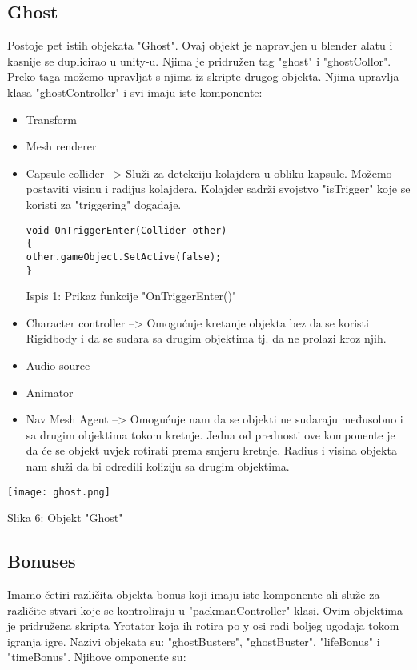 \subsection{Ghost}
Postoje pet istih objekata "Ghost". Ovaj objekt je napravljen u blender alatu i kasnije se duplicirao u unity-u. Njima je pridružen tag "ghost" i "ghostCollor". Preko taga možemo upravljat s njima iz skripte drugog objekta. Njima upravlja klasa "ghostController" i svi imaju iste komponente:

\begin{itemize}
\item Transform

\item Mesh renderer

\item Capsule collider --> Služi za detekciju kolajdera u obliku kapsule. Možemo postaviti visinu i radijus kolajdera. Kolajder sadrži svojstvo "isTrigger" koje se koristi za "triggering" događaje.


\begin{verbatim}
void OnTriggerEnter(Collider other)
{
other.gameObject.SetActive(false);
}
\end{verbatim}
\begin{center}
	
	Ispis 1: Prikaz funkcije "OnTriggerEnter()"
\end{center}
\item Character controller --> Omogućuje kretanje objekta bez da se koristi Rigidbody i da se sudara sa drugim objektima tj. da ne prolazi kroz njih.

\item Audio source

\item Animator

\item Nav Mesh Agent --> Omogućuje nam da se objekti ne sudaraju međusobno i sa drugim objektima tokom kretnje. Jedna od prednosti ove komponente je da će se objekt uvjek rotirati prema smjeru kretnje. Radius i visina objekta nam služi da bi odredili koliziju sa drugim objektima.

\end{itemize}

\begin{center}
	\texttt{[image: ghost.png]}
	
	Slika 6: Objekt "Ghost"
\end{center}
\subsection{Bonuses}
Imamo četiri različita objekta bonus koji imaju iste komponente ali služe za različite stvari koje se kontroliraju u "packmanController" klasi. Ovim objektima je pridružena skripta Yrotator koja ih rotira po y osi radi boljeg ugođaja tokom igranja igre. Nazivi objekata su: "ghostBusters", "ghostBuster", "lifeBonus" i "timeBonus". Njihove omponente su:

